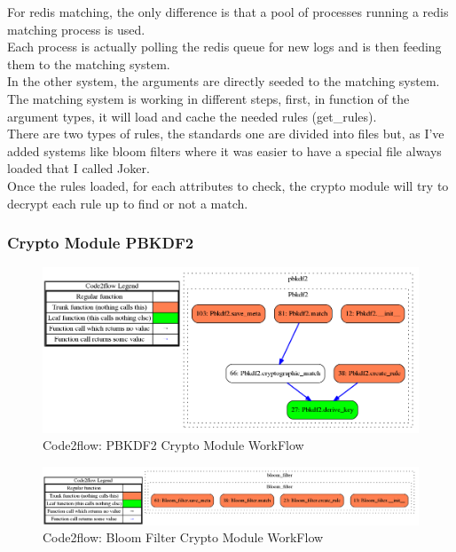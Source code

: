\documentclass{eplmastersthesis}
\begin{document}
For redis matching, the only difference is that a pool of processes running a redis matching process is used.\\
Each process is actually polling the redis queue for new logs and is then feeding them to the matching system.\\
In the other system, the arguments are directly seeded to the matching system.\\

The matching system is working in different steps, first, in function of the argument types, it will load and cache the needed rules (get\_rules).\\
There are two types of rules, the standards one are divided into files but, as I've added systems like bloom filters where it was easier to have a special file always loaded that I called Joker.\\

Once the rules loaded, for each attributes to check, the crypto module will try to decrypt each rule up to find or not a match.

\subsubsection{Crypto Module PBKDF2}

\begin{figure}[h!]
\begin{center}
	\includegraphics[scale=0.3]{res/flowPBKDF2}
	\caption{Code2flow: PBKDF2 Crypto Module WorkFlow}
	\label{code2flow-pbkdf2}
\end{center}
\end{figure}

\begin{figure}[h!]
\begin{center}
	\includegraphics[scale=0.3]{res/flowBloomFilter}
	\caption{Code2flow: Bloom Filter Crypto Module WorkFlow}
	\label{code2flow-bloom}
\end{center}
\end{figure}
\end{document}
